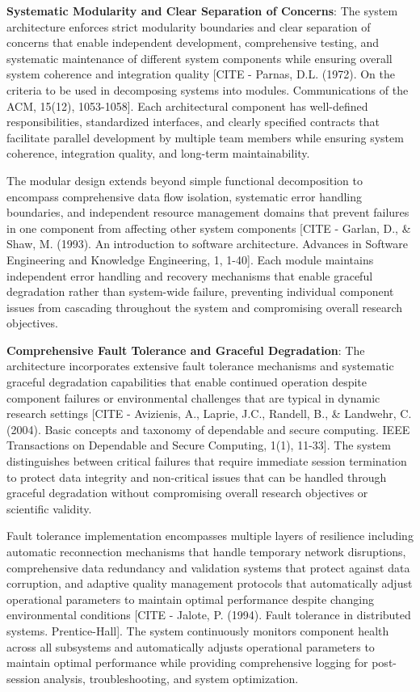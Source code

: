 \documentclass[12pt,a4paper]{article}
\begin{document}
\textbf{Systematic Modularity and Clear Separation of Concerns}: The system architecture enforces strict modularity
boundaries and clear separation of concerns that enable independent development, comprehensive testing, and systematic
maintenance of different system components while ensuring overall system coherence and integration
quality [CITE - Parnas, D.L. (1972). On the criteria to be used in decomposing systems into modules. Communications of the ACM, 15(12), 1053-1058].
Each architectural component has well-defined responsibilities, standardized interfaces, and clearly specified contracts
that facilitate parallel development by multiple team members while ensuring system coherence, integration quality, and
long-term maintainability.

The modular design extends beyond simple functional decomposition to encompass comprehensive data flow isolation,
systematic error handling boundaries, and independent resource management domains that prevent failures in one component
from affecting other system
components [CITE - Garlan, D., \& Shaw, M. (1993). An introduction to software architecture. Advances in Software Engineering and Knowledge Engineering, 1, 1-40].
Each module maintains independent error handling and recovery mechanisms that enable graceful degradation rather than
system-wide failure, preventing individual component issues from cascading throughout the system and compromising
overall research objectives.

\textbf{Comprehensive Fault Tolerance and Graceful Degradation}: The architecture incorporates extensive fault tolerance
mechanisms and systematic graceful degradation capabilities that enable continued operation despite component failures
or environmental challenges that are typical in dynamic research
settings [CITE - Avizienis, A., Laprie, J.C., Randell, B., \& Landwehr, C. (2004). Basic concepts and taxonomy of dependable and secure computing. IEEE Transactions on Dependable and Secure Computing, 1(1), 11-33].
The system distinguishes between critical failures that require immediate session termination to protect data integrity
and non-critical issues that can be handled through graceful degradation without compromising overall research
objectives or scientific validity.

Fault tolerance implementation encompasses multiple layers of resilience including automatic reconnection mechanisms
that handle temporary network disruptions, comprehensive data redundancy and validation systems that protect against
data corruption, and adaptive quality management protocols that automatically adjust operational parameters to maintain
optimal performance despite changing environmental
conditions [CITE - Jalote, P. (1994). Fault tolerance in distributed systems. Prentice-Hall]. The system continuously
monitors component health across all subsystems and automatically adjusts operational parameters to maintain optimal
performance while providing comprehensive logging for post-session analysis, troubleshooting, and system optimization.
\end{document}
